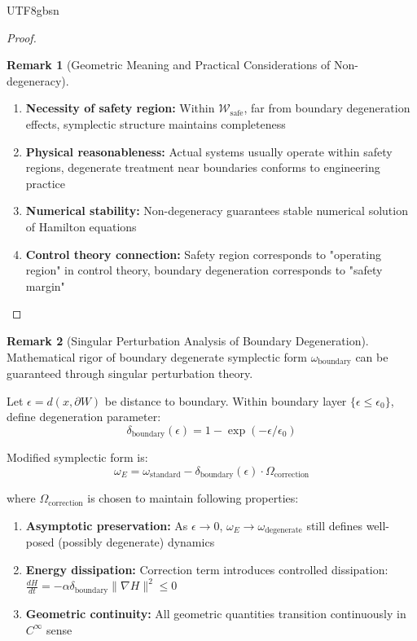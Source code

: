 \documentclass[a4paper,12pt]{extarticle}
\theoremstyle{definition}
\newtheorem{remark}{Remark}
\begin{document}
\begin{CJK}{UTF8}{gbsn}
\begin{proof}
\begin{remark}[Geometric Meaning and Practical Considerations of Non-degeneracy]
\begin{enumerate}
\item \textbf{Necessity of safety region:} Within $\mathcal{W}_{\text{safe}}$, far from boundary degeneration effects, symplectic structure maintains completeness
\item \textbf{Physical reasonableness:} Actual systems usually operate within safety regions, degenerate treatment near boundaries conforms to engineering practice
\item \textbf{Numerical stability:} Non-degeneracy guarantees stable numerical solution of Hamilton equations
\item \textbf{Control theory connection:} Safety region corresponds to "operating region" in control theory, boundary degeneration corresponds to "safety margin"
\end{enumerate}
\end{remark}
\end{proof}

\begin{remark}[Singular Perturbation Analysis of Boundary Degeneration]
Mathematical rigor of boundary degenerate symplectic form $\omega_{\text{boundary}}$ can be guaranteed through singular perturbation theory.

Let $\epsilon = d(x, \partial W)$ be distance to boundary. Within boundary layer $\{\epsilon \leq \epsilon_0\}$, define degeneration parameter:
$$\delta_{\text{boundary}}(\epsilon) = 1 - \exp(-\epsilon/\epsilon_0)$$

Modified symplectic form is:
$$\omega_E = \omega_{\text{standard}} - \delta_{\text{boundary}}(\epsilon) \cdot \Omega_{\text{correction}}$$

where $\Omega_{\text{correction}}$ is chosen to maintain following properties:
\begin{enumerate}
\item \textbf{Asymptotic preservation:} As $\epsilon \to 0$, $\omega_E \to \omega_{\text{degenerate}}$ still defines well-posed (possibly degenerate) dynamics
\item \textbf{Energy dissipation:} Correction term introduces controlled dissipation: \\
$\frac{dH}{dt} = -\alpha\delta_{\text{boundary}}\|\nabla H\|^2 \leq 0$
\item \textbf{Geometric continuity:} All geometric quantities transition continuously in $C^\infty$ sense
\end{enumerate}


\end{remark}
\end{CJK}
\end{document}

